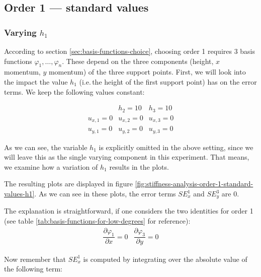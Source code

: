 \documentclass[a4paper, twoside]{article}
\newcommand{\pd}[2]{\dfrac{\partial #1}{\partial #2}}
\renewcommand{\phi}{\varphi}
\begin{document}
\subsection{Order 1 --- standard values}
\label{sec:stiffness-analysis-order-1-standard}

\subsubsection{\texorpdfstring{Varying $h_1$}{Varying h1}}
\label{sec:stiffness-analysis-standard-values-var-h1}

According to section \ref{sec:basis-functions-choice}, choosing order 1 requires 3 basis functions $\phi_1,\dots,\phi_n$. These depend on the three components (height, $x$ momentum, $y$ momentum) of the three support points. First, we will look into the impact the value $h_1$ (i.e.\,the height of the first support point) has on the error terms. We keep the following values constant:

\begin{eqnarray*}
  & h_2 = 10 & h_3 = 10 \\
  u_{x,1} = 0 & u_{x,2} = 0 & u_{x,3} = 0 \\
  u_{y,1} = 0 & u_{y,2} = 0 & u_{y,3} = 0
\end{eqnarray*}

As we can see, the variable $h_1$ is explicitly omitted in the above setting, since we will leave this as the single varying component in this experiment. That means, we examine how a variation of $h_1$ results in the plots.



The resulting plots are displayed in figure \ref{fig:stiffness-analysis-order-1-standard-values-h1}. As we can see in these plots, the error terms $SE_x^1$ and $SE_y^3$ are 0.

The explanation is straightforward, if one considers the two identities for order 1 (see table \ref{tab:basis-functions-for-low-degrees} for reference):
\begin{eqnarray*}
  \pd{\phi_1}{x} = 0 & \pd{\phi_3}{y} = 0
\end{eqnarray*}

Now remember that $SE_x^1$ is computed by integrating over the absolute value of the following term:
\end{document}
